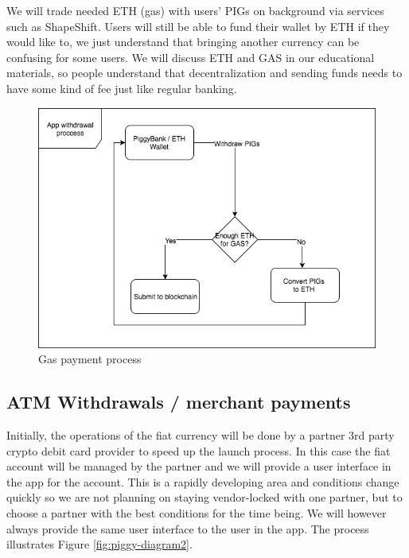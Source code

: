 \documentclass[english]{article}
\begin{document}
We will trade needed ETH (gas) with users’ PIGs on background via services such as ShapeShift. Users will still be able to fund their wallet by ETH if they would like to, we just understand that bringing another currency can be confusing for some users. We will discuss ETH and GAS in our educational materials, so people understand that decentralization and sending funds needs to have some kind of fee just like regular banking.

\begin{figure}[h]
    \centering
    \includegraphics[width=1\textwidth]{PiggyBank-Diagram.png}
    \caption{Gas payment process}
    \label{fig:piggy-diagram}
\end{figure}

\subsection{ATM Withdrawals / merchant payments}
Initially, the operations of the fiat currency will be done by a partner 3rd party crypto debit card provider to speed up the launch process. In this case the fiat account will be managed by the partner and we will provide a user interface in the app for the account. This is a rapidly developing area and conditions change quickly so we are not planning on staying vendor-locked with one partner, but to choose a partner with the best conditions for the time being. We will however always provide the same user interface to the user in the app. The process illustrates Figure \ref{fig:piggy-diagram2}.
\end{document}
